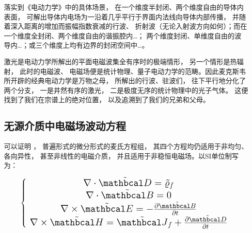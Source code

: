落实到《电动力学》中的具体场景， 在一个维度半封闭、两个维度自由的导体内表面，
可解出导体内电场为一沿着几乎平行于界面内法线向导体内部传播， 并随着深入距离的增加而振幅指数衰减的行波、
折射波（无论入射波方向如何）；而在一个维度全封闭、两个维度自由的谐振腔内\dots；
两个维度封闭、单维度自由的波导内\dots；或三个维度上均有边界的封闭空间中\dots。

激光是电动力学所解出的平面电磁波集全有序时的极端情形， 另一个情形是热辐射， 此时的电磁波、
电磁场便是统计物理、量子电动力学的范畴。因此麦克斯韦所开辟的经典电动力学是万物之母， 所解出的行波、驻波们，
往下平行地分化了两个分支， 一是井然有序的激光， 二是极度无序的统计物理中的光子气体。
这便找到了我们在宗谱上的绝对位置， 以及追溯到了我们的兄弟和父母。

\subsection{无源介质中电磁场波动方程}

可以证明 ， 普遍形式的微分形式的麦氏方程组，
其四个方程均仍适用于非均匀、各向异性， 甚至非线性的电磁介质， 并且适用于非稳恒电磁场。以SI单位制写为：


\begin{theorem}
	\begin{equation}\Large
		\left\{ {\begin{array}{*{20}{c}}
			{\nabla  \cdot \tilde {\mathbcal D} = {{\tilde \varrho }_f}}\\
			{\nabla  \cdot \tilde {\mathbcal B} = 0}\\
			{\nabla  \times \tilde {\mathbcal E} =  - \frac{{\partial \tilde {\mathbcal B}}}{{\partial t}}}\\
			{\nabla  \times \tilde {\mathbcal H} = {{\tilde {\mathbcal J}}_f} + \frac{{\partial \tilde {\mathbcal D}}}{{\partial t}}}
			\end{array}} \right.
	\end{equation}
\end{theorem}

